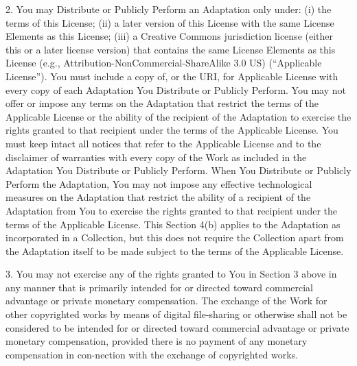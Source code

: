 2. You may Distribute or Publicly Perform an Adaptation only under:
(i) the terms of this License; (ii) a later version of this License
with the same License Elements as this License; (iii) a Creative
Commons jurisdiction license (either this or a later license
version) that contains the same License Elements as this License
(e.g., Attribution-NonCommercial-ShareAlike 3.0 US) (``Applicable
License''). You must include a copy of, or the URI, for Applicable
License with every copy of each Adaptation You Distribute or
Publicly Perform. You may not offer or impose any terms on the
Adaptation that restrict the terms of the Applicable License or the
ability of the recipient of the Adaptation to exercise the rights
granted to that recipient under the terms of the Applicable
License. You must keep intact all notices that refer to the
Applicable License and to the disclaimer of warranties with every
copy of the Work as included in the Adaptation You Distribute or
Publicly Perform. When You Distribute or Publicly Perform the
Adaptation, You may not impose any effective technological measures
on the Adaptation that restrict the ability of a recipient of the
Adaptation from You to exercise the rights granted to that
recipient under the terms of the Applicable License. This Section
4(b) applies to the Adaptation as incorporated in a Collection, but
this does not require the Collection apart from the Adaptation
itself to be made subject to the terms of the Applicable License.

3. You may not exercise any of the rights granted to You in Section
3 above in any manner that is primarily intended for or directed
toward commercial advantage or private monetary compensation. The
exchange of the Work for other copyrighted works by means of
digital file-sharing or otherwise shall not be considered to be
intended for or directed toward commercial advantage or private
monetary compensation, provided there is no payment of any monetary
compensation in con-nection with the exchange of copyrighted
works.

